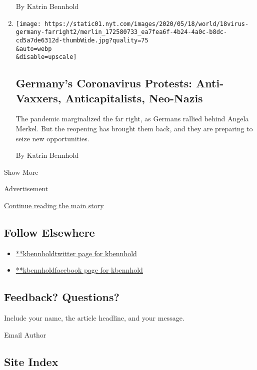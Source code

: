 \begin{enumerate}
  By Katrin Bennhold
\item
  \href{/2020/05/18/world/europe/coronavirus-germany-far-right.html}{}

  \texttt{[image: https://static01.nyt.com/images/2020/05/18/world/18virus-germany-farright2/merlin\_172580733\_ea7fea6f-4b24-4a0c-b8dc-cd5a7de6312d-thumbWide.jpg?quality=75\\\&auto=webp\\\&disable=upscale]}

  \hypertarget{germanys-coronavirus-protests-anti-vaxxers-anticapitalists-neo-nazis}{%
  \subsection{Germany's Coronavirus Protests: Anti-Vaxxers,
  Anticapitalists,
  Neo-Nazis}\label{germanys-coronavirus-protests-anti-vaxxers-anticapitalists-neo-nazis}}

  The pandemic marginalized the far right, as Germans rallied behind
  Angela Merkel. But the reopening has brought them back, and they are
  preparing to seize new opportunities.

  By Katrin Bennhold
\end{enumerate}

Show More

Advertisement

\protect\hyperlink{after-mid2}{Continue reading the main story}

\hypertarget{follow-elsewhere}{%
\subsection{Follow Elsewhere}\label{follow-elsewhere}}

\begin{itemize}
\tightlist
\item
  \href{https://twitter.com/kbennhold}{**kbennholdtwitter page for
  kbennhold}
\item
  \href{https://www.facebook.com/kbennhold}{**kbennholdfacebook page for
  kbennhold}
\end{itemize}

\hypertarget{feedback-questions}{%
\subsection{Feedback? Questions?}\label{feedback-questions}}

Include your name, the article headline, and your message.

Email Author

\hypertarget{site-index}{%
\subsection{Site Index}\label{site-index}}

